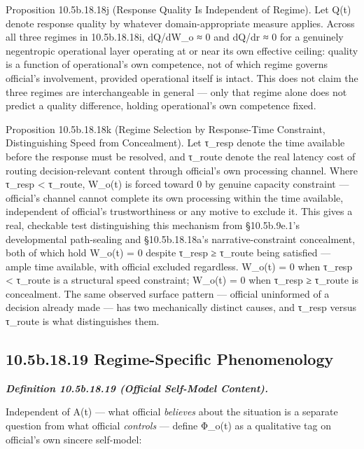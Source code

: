 \documentclass[
]{article}
\begin{document}
Proposition 10.5b.18.18j (Response Quality Is Independent of Regime).
Let Q(t) denote response quality by whatever domain-appropriate measure
applies. Across all three regimes in 10.5b.18.18i, dQ/dW\_o ≈ 0 and
dQ/dr ≈ 0 for a genuinely negentropic operational layer operating at or
near its own effective ceiling: quality is a function of operational's
own competence, not of which regime governs official's involvement,
provided operational itself is intact. This does not claim the three
regimes are interchangeable in general --- only that regime alone does
not predict a quality difference, holding operational's own competence
fixed.

Proposition 10.5b.18.18k (Regime Selection by Response-Time Constraint,
Distinguishing Speed from Concealment). Let τ\_resp denote the time
available before the response must be resolved, and τ\_route denote the
real latency cost of routing decision-relevant content through official's
own processing channel. Where τ\_resp \textless{} τ\_route, W\_o(t) is
forced toward 0 by genuine capacity constraint --- official's channel
cannot complete its own processing within the time available,
independent of official's trustworthiness or any motive to exclude it.
This gives a real, checkable test distinguishing this mechanism from
§10.5b.9e.1's developmental path-sealing and §10.5b.18.18a's
narrative-constraint concealment, both of which hold W\_o(t) = 0 despite
τ\_resp ≥ τ\_route being satisfied --- ample time available, with
official excluded regardless. W\_o(t) = 0 when τ\_resp \textless{}
τ\_route is a structural speed constraint; W\_o(t) = 0 when τ\_resp ≥
τ\_route is concealment. The same observed surface pattern --- official
uninformed of a decision already made --- has two mechanically distinct
causes, and τ\_resp versus τ\_route is what distinguishes them.

\hypertarget{b.18.19-regime-specific-phenomenology}{%
\subsection{10.5b.18.19 Regime-Specific
Phenomenology}\label{b.18.19-regime-specific-phenomenology}}

\emph{\textbf{Definition 10.5b.18.19 (Official Self-Model Content).}}

Independent of A(t) --- what official \emph{believes} about the
situation is a separate question from what official \emph{controls} ---
define Φ\_o(t) as a qualitative tag on official's own sincere
self-model:
\end{document}
